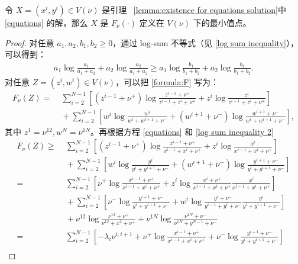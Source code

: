 \begin{lemma}\label{lemma:mininum}
    令 $X=(x^i,y^i)\in V(\nu)$ 是引理 ~\ref{lemma:existence for equations solution}中 \eqref{equations} 的解，那么 $X$ 是 $F_{\nu}(\cdot)$ 定义在 $V(\nu)$ 下的最小值点。 
\end{lemma}
\begin{proof}
    对任意 $a_1,a_2,b_1,b_2\ge 0$，通过 log-sum 不等式（见 \eqref{log sum inequality}），可以得到：
    \begin{align}\label{log sum inequality 2}
        a_1\log\frac{a_1}{a_1+a_2}+a_2\log\frac{a_2}{a_1+a_2}\ge a_1\log\frac{b_1}{b_1+b_2}+a_2\log\frac{b_2}{b_1+b_2}.
    \end{align}
    对任意 $Z=(z^i,w^i)\in V(\nu)$，可以把 \eqref{formula:F} 写为：
    \begin{align*}
        F_{\nu}(Z)
        =&\;\sum_{i=2}^{N-1}\left[ \left(z^{i-1}+\nu^+\right)\log\frac{z^{i-1}+\nu^+}{z^{i-1}+z^{i}+\nu^+} + z^{i}\log\frac{z^{i}}{z^{i-1}+z^{i}+\nu^+}  \right]\\
        &\;+\sum_{i=2}^{N-1}  \left[w^{i}\log\frac{w^{i}}{w^{i} +w^{i+1} +\nu^-} + \left(w^{i+1} +\nu^-\right)\log\frac{w^{i+1} +\nu^-}{w^{i} +w^{i+1} +\nu^-}\right],
    \end{align*}
    其中 $z^{1}=\nu^{12},w^{N}=\nu^{1N}$。再根据方程 \eqref{equations} 和 \eqref{log sum inequality 2}
    \begin{align*}
        F_{\nu}(Z)\ge &\;\sum_{i=2}^{N-1}\left[ \left(z^{i-1}+\nu^+\right)\log\frac{x^{i-1}+\nu^+}{x^{i-1}+x^{i}+\nu^+} + z^{i}\log\frac{x^{i}}{x^{i-1}+x^{i}+\nu^+}  \right]\\
        &\;+\sum_{i=2}^{N-1}  \left[w^{i}\log\frac{y^{i}}{y^{i} +y^{i+1} +\nu^-} + \left(w^{i+1} +\nu^-\right)\log\frac{y^{i+1} +\nu^-}{y^{i} +y^{i+1} +\nu^-}\right]\\
        =&\;\sum_{i=2}^{N-1}\left[ \nu^+\log\frac{x^{i-1}+\nu^+}{x^{i-1}+x^{i}+\nu^+} + z^{i}\log\frac{x^{i}+\nu^{+}}{x^{i-1}+x^{i}+\nu^{+}}\frac{x^{i}}{x^{i-1}+x^{i}+\nu^+}  \right]\\
        &\;+\sum_{i=2}^{N-1}  \left[\nu^-\log\frac{y^{i+1} +\nu^-}{y^{i} +y^{i+1} +\nu^-}+w^{i}\log\frac{y^{i}+\nu^{-}}{y^{i-1}+y^{i}+\nu^{-}}\frac{y^{i}}{y^{i} +y^{i+1} +\nu^-}  \right]\\
        &\;+\nu^{12}\log\frac{\nu^{12}+\nu^{+}}{\nu^{12}+x^{2}+\nu^{+}}+\nu^{1N}\log\frac{\nu^{1N}+\nu^{-}}{\nu^{1N}+y^{N-1}+\nu^{-}}\\
        =&\;\sum_{i=2}^{N-1}\left[-\lambda_i\nu^{i,i+1}+\nu^+\log\frac{x^{i-1}+\nu^+}{x^{i-1}+x^{i}+\nu^+}+\nu^-\log\frac{y^{i+1} +\nu^-}{y^{i} +y^{i+1} +\nu^-}\right]\\

\end{align*}
\end{proof}
